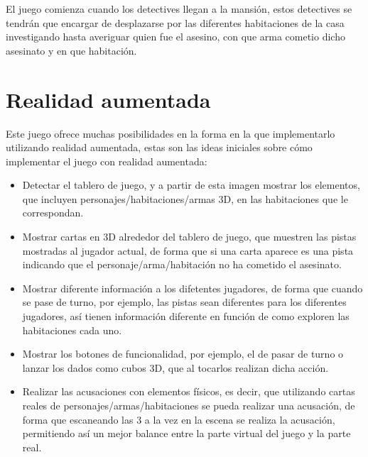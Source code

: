 El juego comienza cuando los detectives llegan a la mansión, estos detectives se tendrán que encargar de desplazarse por las diferentes habitaciones de la casa investigando hasta averiguar quien fue el asesino, con que arma cometio dicho asesinato y en que habitación.

\section{Realidad aumentada}
Este juego ofrece muchas posibilidades en la forma en la que implementarlo utilizando realidad aumentada, estas son las ideas iniciales sobre cómo implementar el juego con realidad aumentada:

\begin{itemize}
  \item Detectar el tablero de juego, y a partir de esta imagen mostrar los elementos, que incluyen personajes/habitaciones/armas 3D, en las habitaciones que le correspondan.
  \item Mostrar cartas en 3D alrededor del tablero de juego, que muestren las pistas mostradas al jugador actual, de forma que si una carta aparece es una pista indicando que el personaje/arma/habitación no ha cometido el asesinato.
  \item Mostrar diferente información a los difetentes jugadores, de forma que cuando se pase de turno, por ejemplo, las pistas sean diferentes para los diferentes jugadores, así tienen información diferente en función de como exploren las habitaciones cada uno.
  \item Mostrar los botones de funcionalidad, por ejemplo, el de pasar de turno o lanzar los dados como cubos 3D, que al tocarlos realizan dicha acción.
  \item Realizar las acusaciones con elementos físicos, es decir, que utilizando cartas reales de personajes/armas/habitaciones se pueda realizar una acusación, de forma que escaneando las 3 a la vez en la escena se realiza la acusación, permitiendo así un mejor balance entre la parte virtual del juego y la parte real.
\end{itemize}
